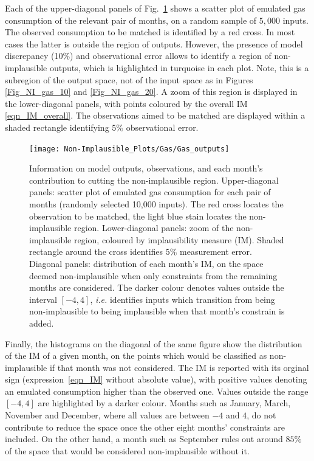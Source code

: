 \documentclass[preprint,12pt, sort&compress]{elsarticle}
\begin{document}
Each of the upper-diagonal panels of Fig.~\ref{Fig_9x9} shows a scatter plot of emulated gas consumption of the relevant pair of months, on a random sample of $5,000$ inputs. The observed consumption to be matched is identified by a red cross. In most cases the latter is outside the region of outputs. However, the presence of model discrepancy (10\%) and observational error allows to identify a region of non-implausible outputs, which is highlighted in turquoise in each plot. Note, this is a subregion of the output space, not of the input space as in Figures \ref{Fig_NI_gas_10} and \ref{Fig_NI_gas_20}. A zoom of this region is displayed in the lower-diagonal panels, with points coloured by the overall IM \eqref{eqn_IM_overall}. The observations aimed to be matched are displayed within a shaded rectangle identifying $5\%$ observational error.

\begin{figure}
\texttt{[image: Non-Implausible\_Plots/Gas/Gas\_outputs]}
\caption{Information on model outputs, observations, and each month’s contribution to cutting the non-implausible region. Upper-diagonal panels: scatter plot of emulated gas consumption for each pair of months (randomly selected 10,000 inputs). The red cross locates the observation to be matched, the light blue stain locates the non-implausible region. Lower-diagonal panels: zoom of the non-implausible region, coloured by implausibility measure (IM). Shaded rectangle around the cross identifies $5\%$ measurement error. Diagonal panels: distribution of each month’s IM, on the space deemed non-implausible when only constraints from the remaining months are considered. The darker colour denotes values outside the interval $[-4,4]$, \textit{i.e.} identifies inputs which transition from being non-implausible to being implausible when that month’s constrain is added. }
\label{Fig_9x9}
\end{figure}

Finally, the histograms on the diagonal of the same figure show the distribution of the IM of a given month, on the points which would be classified as non-implausible if that month was not considered. The IM is reported with its orginal sign (expression~\eqref{eqn_IM} without absolute value), with positive values denoting an emulated consumption higher than the observed one. Values outside the range $[-4,4]$ are highlighted by a darker colour. Months such as January, March, November and December, where all values are between $-4$ and $4$, do not contribute to reduce the space once the other eight months’ constraints are included. On the other hand, a month such as September rules out around $85\%$ of the space that would be considered non-implausible without it.
\end{document}
